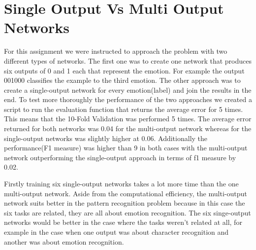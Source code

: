 \documentclass[a4paper,11pt]{article}
\begin{document}
\section{Single Output Vs Multi Output Networks}
For this assignment we were instructed to approach the problem with two different types of networks. The first one was to create one network that produces six outputs of 0 and 1 each that represent the emotion. For example the output 001000 classifies the example to the third emotion. The other approach was to create a single-output network for every emotion(label) and join the results in the end.
To test more thoroughly the performance of the two approaches we created a script to run the evaluation function that returns the average error for 5 times. This means that the 10-Fold Validation was performed 5 times. The average error returned for both networks was 0.04 for the multi-output network whereas for the single-output networks was slightly higher at 0.06. Additionally the performance(F1 measure) was higher than 9 in both cases with the multi-output network outperforming the single-output approach in terms of f1 measure by 0.02.

Firstly training six single-output networks takes a lot more time than the one multi-output network. Aside from the computational efficiency, the multi-output network suits better in the pattern recognition problem because in this case the six tasks are related, they are all about emotion recognition. The six singe-output networks would be better in the case where the tasks weren’t related at all, for example in the case when one output was about character recognition and another was about emotion recognition.
\end{document}
